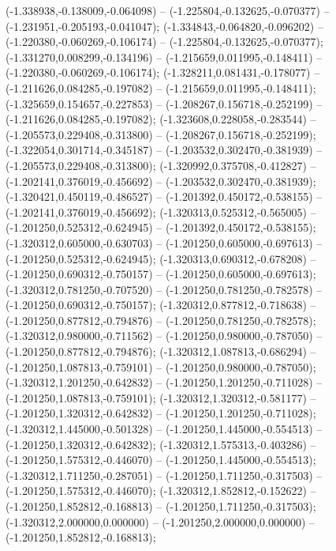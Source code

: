  (-1.338938,-0.138009,-0.064098) -- (-1.225804,-0.132625,-0.070377) -- (-1.231951,-0.205193,-0.041047);
 (-1.334843,-0.064820,-0.096202) -- (-1.220380,-0.060269,-0.106174) -- (-1.225804,-0.132625,-0.070377);
 (-1.331270,0.008299,-0.134196) -- (-1.215659,0.011995,-0.148411) -- (-1.220380,-0.060269,-0.106174);
 (-1.328211,0.081431,-0.178077) -- (-1.211626,0.084285,-0.197082) -- (-1.215659,0.011995,-0.148411);
 (-1.325659,0.154657,-0.227853) -- (-1.208267,0.156718,-0.252199) -- (-1.211626,0.084285,-0.197082);
 (-1.323608,0.228058,-0.283544) -- (-1.205573,0.229408,-0.313800) -- (-1.208267,0.156718,-0.252199);
 (-1.322054,0.301714,-0.345187) -- (-1.203532,0.302470,-0.381939) -- (-1.205573,0.229408,-0.313800);
 (-1.320992,0.375708,-0.412827) -- (-1.202141,0.376019,-0.456692) -- (-1.203532,0.302470,-0.381939);
 (-1.320421,0.450119,-0.486527) -- (-1.201392,0.450172,-0.538155) -- (-1.202141,0.376019,-0.456692);
 (-1.320313,0.525312,-0.565005) -- (-1.201250,0.525312,-0.624945) -- (-1.201392,0.450172,-0.538155);
 (-1.320312,0.605000,-0.630703) -- (-1.201250,0.605000,-0.697613) -- (-1.201250,0.525312,-0.624945);
 (-1.320313,0.690312,-0.678208) -- (-1.201250,0.690312,-0.750157) -- (-1.201250,0.605000,-0.697613);
 (-1.320312,0.781250,-0.707520) -- (-1.201250,0.781250,-0.782578) -- (-1.201250,0.690312,-0.750157);
 (-1.320312,0.877812,-0.718638) -- (-1.201250,0.877812,-0.794876) -- (-1.201250,0.781250,-0.782578);
 (-1.320312,0.980000,-0.711562) -- (-1.201250,0.980000,-0.787050) -- (-1.201250,0.877812,-0.794876);
 (-1.320312,1.087813,-0.686294) -- (-1.201250,1.087813,-0.759101) -- (-1.201250,0.980000,-0.787050);
 (-1.320312,1.201250,-0.642832) -- (-1.201250,1.201250,-0.711028) -- (-1.201250,1.087813,-0.759101);
 (-1.320312,1.320312,-0.581177) -- (-1.201250,1.320312,-0.642832) -- (-1.201250,1.201250,-0.711028);
 (-1.320312,1.445000,-0.501328) -- (-1.201250,1.445000,-0.554513) -- (-1.201250,1.320312,-0.642832);
 (-1.320312,1.575313,-0.403286) -- (-1.201250,1.575312,-0.446070) -- (-1.201250,1.445000,-0.554513);
 (-1.320312,1.711250,-0.287051) -- (-1.201250,1.711250,-0.317503) -- (-1.201250,1.575312,-0.446070);
 (-1.320312,1.852812,-0.152622) -- (-1.201250,1.852812,-0.168813) -- (-1.201250,1.711250,-0.317503);
 (-1.320312,2.000000,0.000000) -- (-1.201250,2.000000,0.000000) -- (-1.201250,1.852812,-0.168813);
